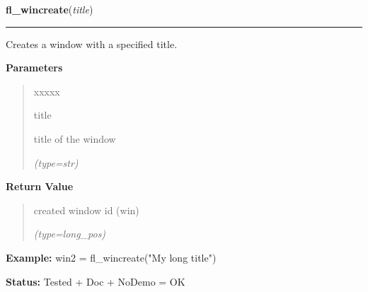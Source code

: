 \hspace{.8\funcindent}\begin{boxedminipage}{\funcwidth}

    \raggedright \textbf{fl\_wincreate}(\textit{title})

    \vspace{-1.5ex}

    \rule{\textwidth}{0.5\fboxrule}
\setlength{\parskip}{2ex}
    Creates a window with a specified title.

\setlength{\parskip}{1ex}
      \textbf{Parameters}
      \vspace{-1ex}

      \begin{quote}
        \begin{Ventry}{xxxxx}

          \item[title]

          title of the window

            {\it (type=str)}

        \end{Ventry}

      \end{quote}

      \textbf{Return Value}
    \vspace{-1ex}

      \begin{quote}
      created window id (win)

      {\it (type=long\_pos)}

      \end{quote}

\textbf{Example:} win2 = fl\_wincreate("My long title")



\textbf{Status:} Tested + Doc + NoDemo = OK



    \end{boxedminipage}

    \label{xformslib:flxbasic:fl_winshow}

    \vspace{0.5ex}

